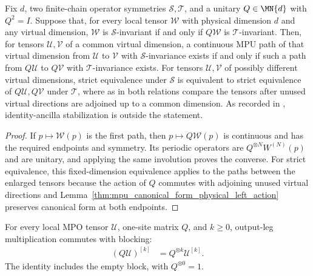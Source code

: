 \begin{lemma}
    \label{thm:mpu_symmetry_path_transport}
    \leanok
    Fix $d$, two finite-chain operator symmetries $\mathcal S,\mathcal T$,
    and a unitary $Q\in\MN{d}$ with $Q^2=I$. Suppose that, for every local
    tensor $\mathcal W$ with physical dimension $d$ and any virtual
    dimension, $\mathcal W$ is $\mathcal S$-invariant if and only if
    $Q\mathcal W$ is $\mathcal T$-invariant. Then, for tensors
    $\mathcal U,\mathcal V$ of a common virtual dimension, a continuous MPU
    path of that virtual dimension from $\mathcal U$ to $\mathcal V$ with
    $\mathcal S$-invariance exists if and only if such a path from
    $Q\mathcal U$ to $Q\mathcal V$ with $\mathcal T$-invariance exists.
    For tensors $\mathcal U,\mathcal V$ of possibly different virtual
    dimensions, strict equivalence under $\mathcal S$ is equivalent to
    strict equivalence of $Q\mathcal U,Q\mathcal V$ under $\mathcal T$,
    where as in \cite{gap:mpu_equivalence_fixed_bond} both relations compare
    the tensors after unused virtual directions are adjoined up to a common
    dimension. As recorded in \cite{gap:mpu_symmetry_ancilla_transport},
    identity-ancilla stabilization is outside the statement.
\end{lemma}

\begin{proof}\leanok
    If $p\mapsto\mathcal W(p)$ is the first path, then
    $p\mapsto Q\mathcal W(p)$ is continuous and has the required
    endpoints and symmetry. Its periodic operators are
    $Q^{\otimes N}W^{(N)}(p)$ and are unitary, and applying the same
    involution proves the converse. For strict equivalence, this
    fixed-dimension equivalence applies to the paths between the enlarged
    tensors because the action of $Q$ commutes with adjoining unused
    virtual directions and
    Lemma~\ref{thm:mpu_canonical_form_physical_left_action} preserves
    canonical form at both endpoints.
\end{proof}

\begin{lemma}
    \label{thm:mpu_physical_left_action_blocking}
    \leanok
    For every local MPO tensor $\mathcal U$, one-site matrix $Q$, and
    $k\geq0$, output-leg multiplication commutes with blocking:
    \begin{align}
        (Q\mathcal U)^{[k]}
         & =Q^{\otimes k}\mathcal U^{[k]}.
        \label{eq:mpu_left_action_blocking}
    \end{align}
    The identity includes the empty block, with $Q^{\otimes0}=1$.
\end{lemma}

